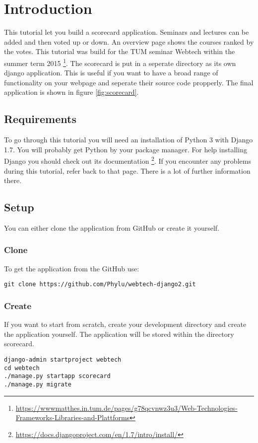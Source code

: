 \section{Introduction}

This tutorial let you build a scorecard application. Seminars and lectures can be added and then voted up or down. An overview page shows the courses ranked by the votes. This tutorial was build for the TUM seminar Webtech within the summer term 2015 \footnote{\url{https://wwwmatthes.in.tum.de/pages/g78qcvnwz3u3/Web-Technologies-Frameworks-Libraries-and-Plattforms}}. The scorecard is put in a seperate directory as its own django application. This is useful if you want to have a broad range of functionality on your webpage and seperate their source code propperly. The final application is shown in figure \ref{fig:scorecard}.


\subsection{Requirements}

To go through this tutorial you will need an installation of Python 3 with Django 1.7. You will probably get Python by your package manager. For help installing Django you should check out its documentation \footnote{\url{https://docs.djangoproject.com/en/1.7/intro/install/}}. If you encounter any problems during this tutorial, refer back to that page. There is a lot of further information there.

\subsection{Setup}
You can either clone the application from GitHub or create it yourself.

\subsubsection{Clone}
To get the application from the GitHub use:
\begin{lstlisting}[style=Bash, caption=Clone application, label=lst:clone_app]
git clone https://github.com/Phylu/webtech-django2.git
\end{lstlisting}

\subsubsection{Create}
If you want to start from scratch, create your development directory and create the application yourself. The application will be stored within the directory scorecard.
\begin{lstlisting}[style=Bash, caption=Create application, label=lst:create_app]
django-admin startproject webtech
cd webtech
./manage.py startapp scorecard
./manage.py migrate
\end{lstlisting}

